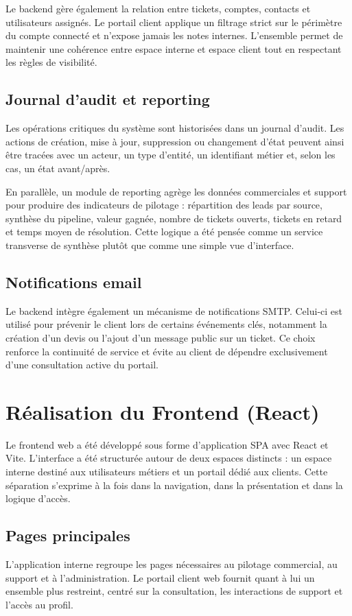 Le backend gère également la relation entre tickets, comptes, contacts et utilisateurs assignés. Le portail client applique un filtrage strict sur le périmètre du compte connecté et n'expose jamais les notes internes. L'ensemble permet de maintenir une cohérence entre espace interne et espace client tout en respectant les règles de visibilité.

\subsection{Journal d'audit et reporting}
Les opérations critiques du système sont historisées dans un journal d'audit. Les actions de création, mise à jour, suppression ou changement d'état peuvent ainsi être tracées avec un acteur, un type d'entité, un identifiant métier et, selon les cas, un état avant/après.\par
\vspace{0.3cm}

En parallèle, un module de reporting agrège les données commerciales et support pour produire des indicateurs de pilotage : répartition des leads par source, synthèse du pipeline, valeur gagnée, nombre de tickets ouverts, tickets en retard et temps moyen de résolution. Cette logique a été pensée comme un service transverse de synthèse plutôt que comme une simple vue d'interface.

\subsection{Notifications email}
Le backend intègre également un mécanisme de notifications SMTP. Celui-ci est utilisé pour prévenir le client lors de certains événements clés, notamment la création d'un devis ou l'ajout d'un message public sur un ticket. Ce choix renforce la continuité de service et évite au client de dépendre exclusivement d'une consultation active du portail.

\section{Réalisation du Frontend (React)}
Le frontend web a été développé sous forme d'application SPA avec React et Vite. L'interface a été structurée autour de deux espaces distincts : un espace interne destiné aux utilisateurs métiers et un portail dédié aux clients. Cette séparation s'exprime à la fois dans la navigation, dans la présentation et dans la logique d'accès.

\subsection{Pages principales}
L'application interne regroupe les pages nécessaires au pilotage commercial, au support et à l'administration. Le portail client web fournit quant à lui un ensemble plus restreint, centré sur la consultation, les interactions de support et l'accès au profil.

